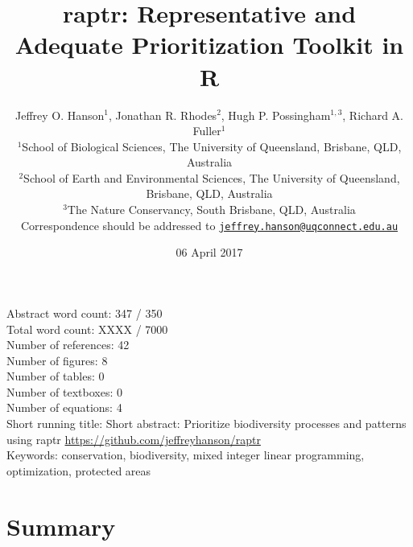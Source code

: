\documentclass[11pt,]{article}
\title{raptr: Representative and Adequate Prioritization Toolkit in R}
\author{Jeffrey O. Hanson\(^1\), Jonathan R. Rhodes\(^2\), Hugh P.
Possingham\(^{1,3}\), Richard A. Fuller\(^1\)\\
\(^1\)School of Biological Sciences, The University of Queensland,
Brisbane, QLD, Australia\\
\(^2\)School of Earth and Environmental Sciences, The University of
Queensland, Brisbane, QLD, Australia\\
\(^3\)The Nature Conservancy, South Brisbane, QLD, Australia\\
Correspondence should be addressed to
\href{mailto:jeffrey.hanson@uqconnect.edu.au}{\nolinkurl{jeffrey.hanson@uqconnect.edu.au}}}
\date{06 April 2017}
\begin{document}
\maketitle

Abstract word count: 347 / 350\\
Total word count: XXXX / 7000\\
Number of references: 42\\
Number of figures: 8\\
Number of tables: 0\\
Number of textboxes: 0\\
Number of equations: 4\\
Short running title: Short abstract: Prioritize biodiversity processes
and patterns using raptr \url{https://github.com/jeffreyhanson/raptr}\\
Keywords: conservation, biodiversity, mixed integer linear programming,
optimization, protected areas

\clearpage

\section{Summary}\label{summary}
\end{document}
